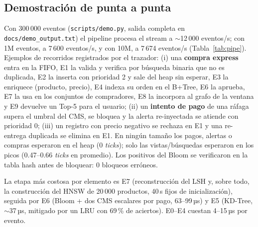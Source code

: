 \subsection{Demostración de punta a punta}\label{sec:demo}
Con 300\,000 eventos (\texttt{scripts/demo.py}, salida completa en \texttt{docs/demo\_output.txt}) el pipeline procesa el stream a $\sim$12\,000 eventos/s;
con 1M eventos, a 7\,600 eventos/s, y con 10M, a 7\,674 eventos/s (Tabla~\ref{tab:pipe}). Ejemplos de recorridos registrados por el trazador:
(i) una \textbf{compra express} entra en la FIFO, E1 la valida y verifica por búsqueda binaria que no es duplicada, E2 la inserta con prioridad 2 y sale del heap sin
esperar, E3 la enriquece (producto, precio), E4 indexa su orden en el B+Tree, E6 la aprueba, E7 la usa en los conjuntos de compradores, E8 la incorpora al grafo de la
ventana y E9 devuelve un Top-5 para el usuario; (ii) un \textbf{intento de pago} de una ráfaga supera el umbral del CMS, se bloquea y la alerta re-inyectada se atiende
con prioridad 0; (iii) un registro con precio negativo se rechaza en E1 y una re-entrega duplicada se elimina en E1. En ningún tamaño los pagos, alertas o compras
esperaron en el heap (0 \emph{ticks}); solo las vistas/búsquedas esperaron en los picos (0.47–0.66 \emph{ticks} en promedio). Los positivos del Bloom se
verificaron en la tabla hash antes de bloquear: 0 bloqueos erróneos.

\begin{table}[H]\centering\small
\caption{Pipeline completo (20\,000 productos, micro-lote 5\,000; 10\,000 en 10M). Costo por etapa en µs por elemento que la etapa procesa.}\label{tab:pipe}
\resizebox{\linewidth}{!}{}
\end{table}
\vspace{-6pt}
La etapa más costosa por elemento es E7 (reconstrucción del LSH y, sobre todo, la construcción del HNSW de 20\,000 productos, 40\,s fijos de inicialización), seguida
por E6 (Bloom + dos CMS escalares por pago, 63–99\,µs) y E5 (KD-Tree, $\sim$37\,µs, mitigado por un LRU con 69\,\% de aciertos). E0–E4 cuestan 4–15\,µs por evento.

